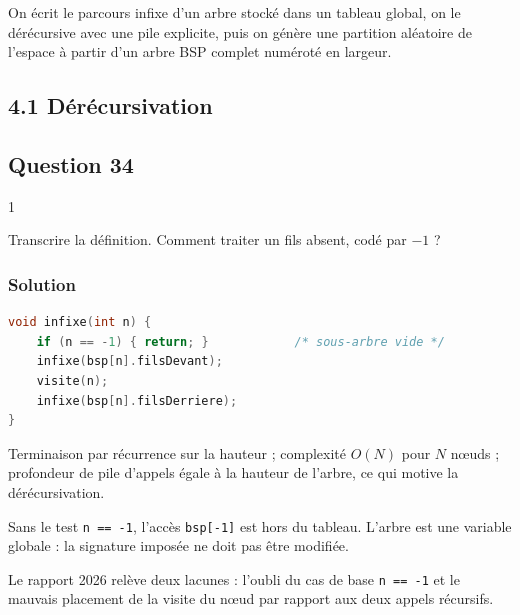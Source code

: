 \documentclass[11pt,a4paper]{article}
\begin{document}
On écrit le parcours infixe d'un arbre stocké dans un tableau global, on le dérécursive avec une pile explicite, puis on génère une partition aléatoire de l'espace à partir d'un arbre BSP complet numéroté en largeur.

\hypertarget{duxe9ruxe9cursivation}{%
\subsection{4.1 Dérécursivation}\label{duxe9ruxe9cursivation}}

\hypertarget{question-34}{%
\subsection{Question 34}\label{question-34}}

\begin{indication}{1}

Transcrire la définition. Comment traiter un fils absent, codé par \(-1\) ?

\end{indication}

\hypertarget{solution-33}{%
\subsubsection{Solution}\label{solution-33}}

\begin{lstlisting}[language=C]
void infixe(int n) {
    if (n == -1) { return; }            /* sous-arbre vide */
    infixe(bsp[n].filsDevant);
    visite(n);
    infixe(bsp[n].filsDerriere);
}
\end{lstlisting}

Terminaison par récurrence sur la hauteur ; complexité \(O(N)\) pour \(N\) nœuds ; profondeur de pile d'appels égale à la hauteur de l'arbre, ce qui motive la dérécursivation.

\begin{piege}

Sans le test \texttt{n\ ==\ -1}, l'accès \texttt{bsp{[}-1{]}} est hors du tableau. L'arbre est une variable globale : la signature imposée ne doit pas être modifiée.

\end{piege}

\begin{jury}

Le rapport 2026 relève deux lacunes : l'oubli du cas de base \texttt{n\ ==\ -1} et le mauvais placement de la visite du nœud par rapport aux deux appels récursifs.

\end{jury}
\end{document}
